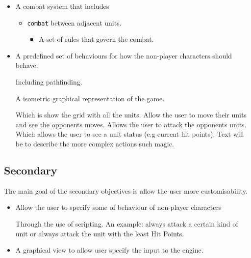\begin{itemize}
\begin{itemize}
	\item A combat system that includes
		\begin{itemize}
			\item \texttt{combat} between adjacent units.
			\begin{itemize}
				\tick When the unit hit-points are reduced to zero they are \texttt{defeated} and are removed from the map
			\item A set of rules that govern the combat.
			\end{itemize}
			
		\end{itemize}
	
	\item A predefined set of behaviours for how the non-player characters should behave.
	\begin{itemize}
		\tick Including pathfinding.
	\end{itemize}
	
	\tick A isometric graphical representation of the game.
	\begin{itemize}
		\tick Which is show the grid with all the units.
		\tick Allow the user to move their units and see the opponents moves.
		\tick Allows the user to attack the opponents units.
		\tick Which allows the user to see a unit status (e.g current hit points).
		\tick Text will be to describe the more complex actions such magic.
	\end{itemize}
\end{itemize}
\end{itemize}

\subsection{Secondary}
\label{secondary}
The main goal of the secondary objectives is allow the user more customisability. 
\begin{itemize}
	\tick Tile have \texttt{height}, where units can only move to tiles of a smilier height.
	\cross Tiles that are not passable such as sea, lava, etc.
	
	\tick Tiles have different movement costs associated with them.
		
	\cross Long distance weapons\slash magic for player and AI.
	
	\cross Direction and height of the character's tile affects attack.
	
	\tick Sound effects.
	
	\tick Music.
	
	\cross Saving and loading games.
	
	\item Allow the user to specify some of behaviour of non-player characters
	\begin{itemize}
		\cross Through the use of scripting.
		\cross An example: always attack a certain kind of unit or always attack the unit with the least Hit Points.
	\end{itemize}
	
	\item A graphical view to allow user specify the input to the engine.
\end{itemize}

